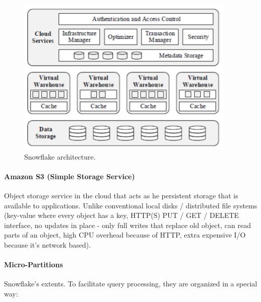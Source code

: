\begin{figure}[h]
	\centering
	\includegraphics[scale=0.8]{images/1-snowflake.PNG}
	\caption{Snowflake architecture.}
	\label{fig:snowflake}
\end{figure}

\paragraph{Amazon S3 (Simple Storage Service)}
Object storage service in the cloud that acts as he persistent storage that is available to applications. Unlike conventional local disks / distributed file systems (key-value where every object has a key, HTTP(S) PUT / GET / DELETE interface, no updates in place - only full writes that replace old object, can read parts of an object, high CPU overhead because of HTTP, extra expensive I/O because it's network based).

\paragraph{Micro-Partitions}
Snowflake's extents. To facilitate query processing, they are organized in a special way:

